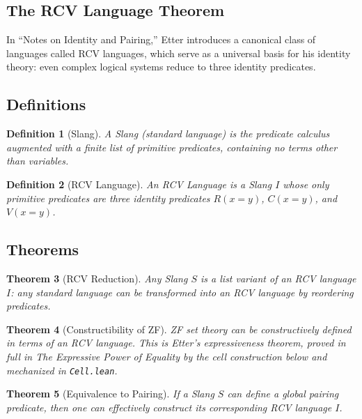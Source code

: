 \documentclass{ws-rv9x6}
\newtheorem{theorem}{Theorem}[section]
\newtheorem{definition}[theorem]{Definition}
\theoremstyle{remark}
\begin{document}
\begin{appendices}
\section{The RCV Language Theorem}
\label{app:rcv}

In ``Notes on Identity and Pairing,'' Etter introduces a canonical class of languages called RCV languages, which serve as a universal basis for his identity theory: even complex logical systems reduce to three identity predicates.

\subsection{Definitions}

\begin{definition}[Slang]
A \emph{Slang} (standard language) is the predicate calculus augmented with a finite list of primitive predicates, containing no terms other than variables.
\end{definition}

\begin{definition}[RCV Language]
An \emph{RCV Language} is a Slang $I$ whose only primitive predicates are three identity predicates $R(x{=}y)$, $C(x{=}y)$, and $V(x{=}y)$.
\end{definition}

\subsection{Theorems}

\begin{theorem}[RCV Reduction]
Any Slang $S$ is a list variant of an RCV language $I$: any standard language can be transformed into an RCV language by reordering predicates.
\end{theorem}

\begin{theorem}[Constructibility of ZF]
ZF set theory can be constructively defined in terms of an RCV language. This is Etter's expressiveness theorem, proved in full in \emph{The Expressive Power of Equality}\cite{etter_power} by the cell construction below and mechanized in \texttt{Cell.lean}.
\end{theorem}

\begin{theorem}[Equivalence to Pairing]
If a Slang $S$ can define a global pairing predicate, then one can effectively construct its corresponding RCV language $I$.
\end{theorem}


\end{appendices}
\end{document}
